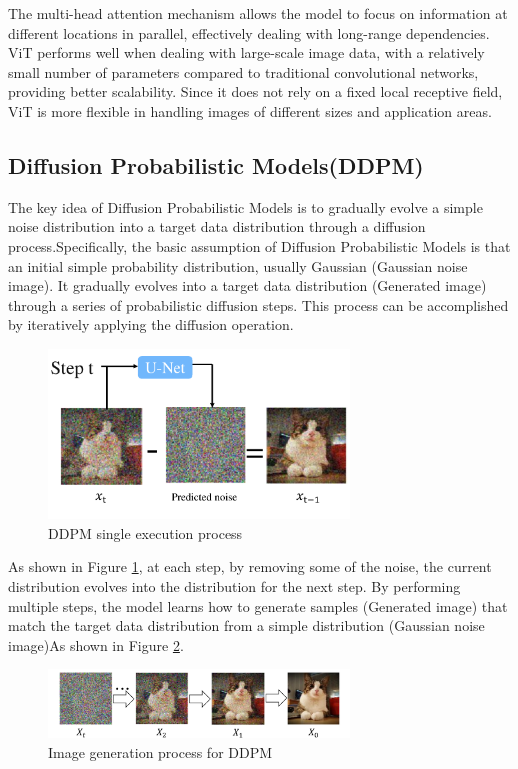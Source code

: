 \documentclass{acsman}
\begin{document}
The multi-head attention mechanism allows the model to focus on information at different locations in parallel, effectively dealing with long-range dependencies. ViT performs well when dealing with large-scale image data, with a relatively small number of parameters compared to traditional convolutional networks, providing better scalability. Since it does not rely on a fixed local receptive field, ViT is more flexible in handling images of different sizes and application areas.

\subsection{Diffusion Probabilistic Models(DDPM)}
The key idea of Diffusion Probabilistic Models \cite{ho2020denoising} is to gradually evolve a simple noise distribution into a target data distribution through a diffusion process.Specifically, the basic assumption of Diffusion Probabilistic Models is that an initial simple probability distribution, usually Gaussian (Gaussian noise image). It gradually evolves into a target data distribution (Generated image) through a series of probabilistic diffusion steps. This process can be accomplished by iteratively applying the diffusion operation. 
\begin{figure}[h]
    \centering
    \includegraphics[width=8cm]{image/DDPM.pdf}
    \caption{DDPM single execution process}
    \label{fig:DDPM}
\end{figure}

As shown in Figure \ref{fig:DDPM}, at each step, by removing some of the noise, the current distribution evolves into the distribution for the next step. By performing multiple steps, the model learns how to generate samples (Generated image) that match the target data distribution from a simple distribution (Gaussian noise image)As shown in Figure \ref{fig:DDPM1}.
\begin{figure}[h]
    \centering
    \includegraphics[width=8cm]{image/DDPM1.pdf}
    \caption{Image generation process for DDPM}
    \label{fig:DDPM1}
\end{figure}
\end{document}
